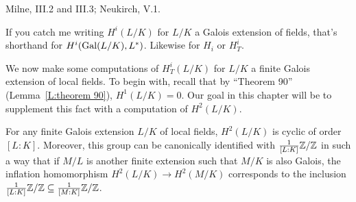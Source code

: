 %
%
%
%
%
%
%

 Milne, III.2 and III.3; Neukirch, V.1.

 If you catch me writing $H^i(L/K)$
for $L/K$ a Galois extension of fields,
that's shorthand for $H^i(\operatorname{Gal}(L/K), L^*)$. Likewise for $H_i$ or
$H^i_T$.

\medskip
We now make some computations of $H^i_T(L/K)$ for $L/K$
a finite Galois
extension of local fields.
To begin with, recall that by ``Theorem 90'' (Lemma~\ref{L:theorem 90}), $H^1(L/K) = 0$.
Our goal in this chapter will be to supplement this fact with a computation of $H^2(L/K)$.
\begin{prop} \label{P:local h2}
For any finite Galois extension $L/K$ of local fields, $H^2(L/K)$
is cyclic of order $[L:K]$. Moreover, this group can be canonically
identified with $\frac{1}{[L:K]}\mathbb{Z}/\mathbb{Z}$ in such a way that
if $M/L$ is another finite extension such that
$M/K$ is also Galois, the inflation homomorphism
$H^2(L/K) \to H^2(M/K)$ corresponds to the inclusion
$\frac{1}{[L:K]}\mathbb{Z}/\mathbb{Z} \subseteq \frac{1}{[M:K]}\mathbb{Z}/\mathbb{Z}$.
\end{prop}

